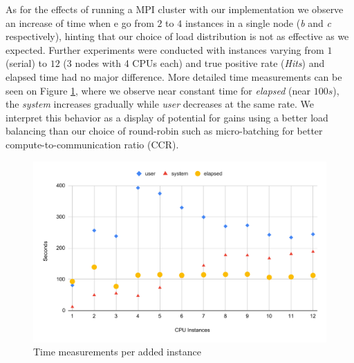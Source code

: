As for the effects of running a MPI cluster with our implementation we observe
an increase of time when e go from $2$ to $4$ instances in a single node
(\emph{b} and \emph{c} respectively), hinting that our choice of load
distribution is not as effective as we expected.
Further experiments were conducted with instances varying from $1$ (serial) to
$12$ (3 nodes with 4 CPUs each) and true positive rate (\emph{Hits}) and elapsed
time had no major difference.
More detailed time measurements can be seen on Figure \ref{fig:speedup},
where we observe near constant time for \emph{elapsed} (near $100s$),
the \emph{system} increases gradually while \emph{user} decreases at the same rate.
We interpret this behavior as a display of potential for gains using a better
load balancing than our choice of round-robin such as micro-batching for better
compute-to-communication ratio (CCR).







\begin{figure}[hbt]
  \centering
  \includegraphics[width=\whencolumns{0.6}{1}\linewidth,page=1]{experiments/speedup-clean.pdf}
  \caption{Time measurements per added instance}
  \label{fig:speedup}
\end{figure}

